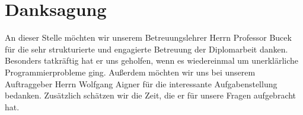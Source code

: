 \section*{Danksagung}
An dieser Stelle möchten wir unserem Betreuungslehrer Herrn Professor Bucek für die sehr strukturierte und engagierte Betreuung der Diplomarbeit danken. Besonders tatkräftig hat er uns geholfen, wenn es wiedereinmal um unerklärliche Programmierprobleme ging. \newline Außerdem möchten wir uns bei unserem Auftraggeber Herrn Wolfgang Aigner für die interessante Aufgabenstellung bedanken. Zusätzlich schätzen wir die Zeit, die er für unsere Fragen aufgebracht hat.
